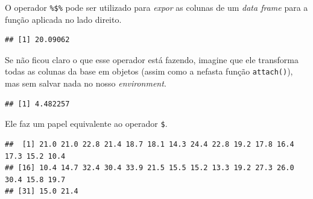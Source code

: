 \documentclass[
]{book}
\newenvironment{Shaded}{\begin{snugshade}}{\end{snugshade}}
\newcommand{\CommentTok}[1]{\textcolor[rgb]{0.56,0.35,0.01}{\textit{#1}}}
\newcommand{\FunctionTok}[1]{\textcolor[rgb]{0.00,0.00,0.00}{#1}}
\newcommand{\NormalTok}[1]{#1}
\newcommand{\SpecialCharTok}[1]{\textcolor[rgb]{0.00,0.00,0.00}{#1}}
\begin{document}
O operador \texttt{\%\$\%} pode ser utilizado para \emph{expor} as colunas de um \emph{data frame} para a função aplicada no lado direito.

\begin{Shaded}
\end{Shaded}

\begin{verbatim}
## [1] 20.09062
\end{verbatim}

Se não ficou claro o que esse operador está fazendo, imagine que ele transforma todas as colunas da base em objetos (assim como a nefasta função \texttt{attach()}), mas sem salvar nada no nosso \emph{environment}.

\begin{Shaded}
\end{Shaded}

\begin{verbatim}
## [1] 4.482257
\end{verbatim}

Ele faz um papel equivalente ao operador \texttt{\$}.

\begin{Shaded}
\end{Shaded}

\begin{verbatim}
##  [1] 21.0 21.0 22.8 21.4 18.7 18.1 14.3 24.4 22.8 19.2 17.8 16.4 17.3 15.2 10.4
## [16] 10.4 14.7 32.4 30.4 33.9 21.5 15.5 15.2 13.3 19.2 27.3 26.0 30.4 15.8 19.7
## [31] 15.0 21.4
\end{verbatim}

\begin{Shaded}
\end{Shaded}
\end{document}
